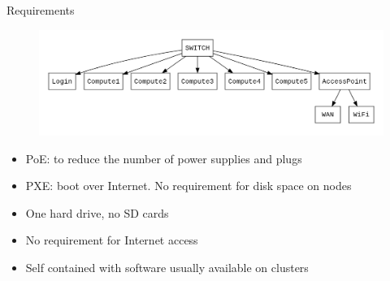 \begin{frame}{Requirements}
	\begin{figure}
		\centering
		\includegraphics[width=\linewidth]{graphics/architecture.png}
	\end{figure}
	\begin{itemize}[label={$\color{UmUBlue}\bullet$}]
		\item PoE: to reduce the number of power supplies and plugs
		\item PXE: boot over Internet. No requirement for disk space on nodes
		\item One hard drive, no SD cards
		\item No requirement for Internet access
		\item Self contained with software usually available on clusters
	\end{itemize}
\end{frame}